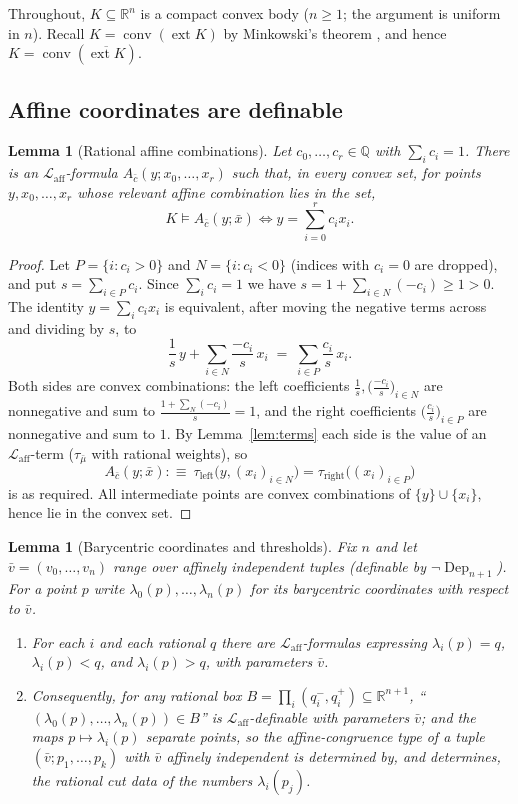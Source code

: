 \documentclass[11pt]{amsart}
\newtheorem{lemma}[theorem]{Lemma}
\theoremstyle{definition}
\newcommand{\R}{\mathbb{R}}
\newcommand{\Q}{\mathbb{Q}}
\newcommand{\Laff}{\mathcal{L}_{\mathrm{aff}}}
\newcommand{\Dep}{\operatorname{Dep}}
\newcommand{\conv}{\operatorname{conv}}
\newcommand{\ext}{\operatorname{ext}}
\begin{document}
Throughout, $K\subseteq\R^n$ is a compact convex body ($n\ge1$; the
argument is uniform in $n$). Recall $K=\conv(\ext K)$ by Minkowski's theorem
\cite[Cor.~1.4.5]{Schneider14}, and hence $K=\conv(\overline{\ext K})$.

\subsection{Affine coordinates are definable}\label{subsec:affexpr}

\begin{lemma}[Rational affine combinations]\label{lem:affine-comb}
Let $c_0,\dots,c_r\in\Q$ with $\sum_i c_i=1$. There is an $\Laff$-formula
$A_{\bar c}(y;x_0,\dots,x_r)$ such that, in every convex set, for points
$y,x_0,\dots,x_r$ whose relevant affine combination lies in the set,
\[
K\models A_{\bar c}(y;\bar x)\iff y=\sum_{i=0}^r c_i x_i .
\]
\end{lemma}

\begin{proof}
Let $P=\{i:c_i>0\}$ and $N=\{i:c_i<0\}$ (indices with $c_i=0$ are dropped),
and put $s=\sum_{i\in P}c_i$. Since $\sum_ic_i=1$ we have
$s=1+\sum_{i\in N}(-c_i)\ge1>0$. The identity $y=\sum_ic_ix_i$ is equivalent,
after moving the negative terms across and dividing by $s$, to
\[
\frac{1}{s}\,y+\sum_{i\in N}\frac{-c_i}{s}\,x_i
\;=\;\sum_{i\in P}\frac{c_i}{s}\,x_i .
\]
Both sides are convex combinations: the left coefficients
$\tfrac1s,\bigl(\tfrac{-c_i}{s}\bigr)_{i\in N}$ are nonnegative and sum to
$\tfrac{1+\sum_N(-c_i)}{s}=1$, and the right coefficients
$\bigl(\tfrac{c_i}{s}\bigr)_{i\in P}$ are nonnegative and sum to $1$. By
Lemma~\ref{lem:terms} each side is the value of an $\Laff$-term
($\tau_{\bar\mu}$ with rational weights), so
\[
A_{\bar c}(y;\bar x):\equiv\ 
\tau_{\mathrm{left}}\bigl(y,(x_i)_{i\in N}\bigr)
=\tau_{\mathrm{right}}\bigl((x_i)_{i\in P}\bigr)
\]
is as required. All intermediate points are convex combinations of
$\{y\}\cup\{x_i\}$, hence lie in the convex set.
\end{proof}

\begin{lemma}[Barycentric coordinates and thresholds]
\label{lem:bary-def}
Fix $n$ and let $\bar v=(v_0,\dots,v_n)$ range over affinely independent
tuples (definable by $\neg\Dep_{n+1}$). For a point $p$ write
$\lambda_0(p),\dots,\lambda_n(p)$ for its barycentric coordinates with respect
to $\bar v$.
\begin{enumerate}[label=\textup{(\roman*)}]
\item For each $i$ and each rational $q$ there are $\Laff$-formulas expressing
$\lambda_i(p)=q$, $\lambda_i(p)<q$, and $\lambda_i(p)>q$, with parameters
$\bar v$.
\item Consequently, for any rational box
$B=\prod_i(q_i^-,q_i^+)\subseteq\R^{n+1}$, ``$(\lambda_0(p),\dots,
\lambda_n(p))\in B$'' is $\Laff$-definable with parameters $\bar v$; and the
maps $p\mapsto\lambda_i(p)$ separate points, so the affine-congruence type of
a tuple $(\bar v;p_1,\dots,p_k)$ with $\bar v$ affinely independent is
determined by, and determines, the rational cut data of the numbers
$\lambda_i(p_j)$.
\end{enumerate}
\end{lemma}
\end{document}
